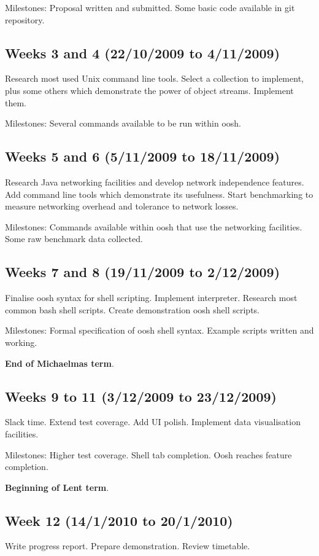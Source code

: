 \documentclass[12pt]{article}
\begin{document}
Milestones: Proposal written and submitted. Some basic code available
in git repository.

\subsection*{Weeks 3 and 4 (22/10/2009 to 4/11/2009)}
Research most used Unix command line tools. Select a collection to
implement, plus some others which demonstrate the power of object
streams. Implement them.

Milestones: Several commands available to be run within oosh.

\subsection*{Weeks 5 and 6 (5/11/2009 to 18/11/2009)}
Research Java networking facilities and develop network independence
features. Add command line tools which demonstrate its
usefulness. Start benchmarking to measure networking overhead and
tolerance to network losses.

Milestones: Commands available within oosh that use the networking
facilities. Some raw benchmark data collected.

\subsection*{Weeks 7 and 8 (19/11/2009 to 2/12/2009)}
Finalise oosh syntax for shell scripting. Implement
interpreter. Research most common bash shell scripts. Create
demonstration oosh shell scripts.

Milestones: Formal specification of oosh shell syntax. Example scripts
written and working.

{\bf End of Michaelmas term}.

\subsection*{Weeks 9 to 11 (3/12/2009 to 23/12/2009)}
Slack time. Extend test coverage. Add UI polish. Implement data
visualisation facilities.

Milestones: Higher test coverage. Shell tab completion. Oosh reaches
feature completion.

{\bf Beginning of Lent term}.

\subsection*{Week 12 (14/1/2010 to 20/1/2010)}
Write progress report. Prepare demonstration. Review timetable.
\end{document}
